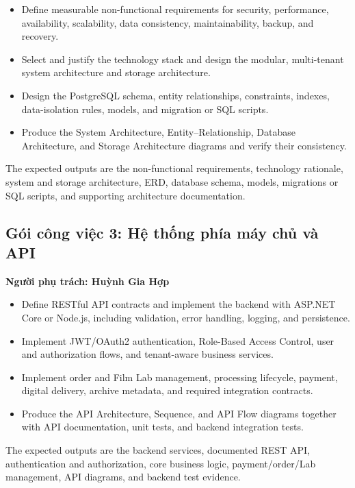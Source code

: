 \begin{itemize}
	\item Define measurable non-functional requirements for security,
	performance, availability, scalability, data consistency, maintainability,
	backup, and recovery.
	\item Select and justify the technology stack and design the modular,
	multi-tenant system architecture and storage architecture.
	\item Design the PostgreSQL schema, entity relationships, constraints,
	indexes, data-isolation rules, models, and migration or SQL scripts.
	\item Produce the System Architecture, Entity--Relationship, Database
	Architecture, and Storage Architecture diagrams and verify their consistency.
\end{itemize}

The expected outputs are the non-functional requirements, technology rationale,
system and storage architecture, ERD, database schema, models, migrations or SQL
scripts, and supporting architecture documentation.

\subsection*{Gói công việc 3: Hệ thống phía máy chủ và API}

\textbf{Người phụ trách: Huỳnh Gia Hợp}

\begin{itemize}
	\item Define RESTful API contracts and implement the backend with ASP.NET Core
	or Node.js, including validation, error handling, logging, and persistence.
	\item Implement JWT/OAuth2 authentication, Role-Based Access Control, user
	and authorization flows, and tenant-aware business services.
	\item Implement order and Film Lab management, processing lifecycle, payment,
	digital delivery, archive metadata, and required integration contracts.
	\item Produce the API Architecture, Sequence, and API Flow diagrams together
	with API documentation, unit tests, and backend integration tests.
\end{itemize}

The expected outputs are the backend services, documented REST API, authentication
and authorization, core business logic, payment/order/Lab management, API
diagrams, and backend test evidence.

